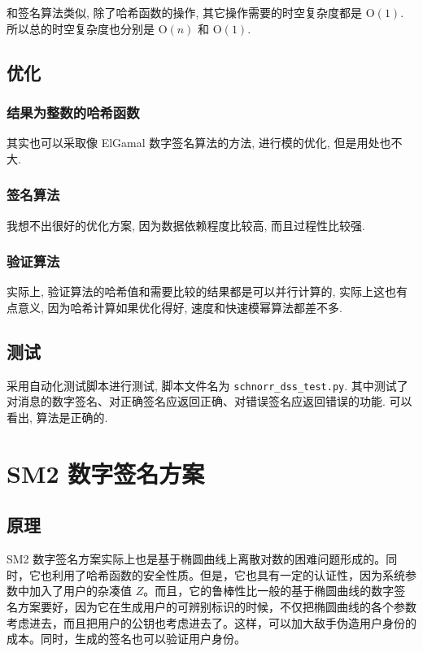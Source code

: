 \documentclass[12pt,a4paper]{article}
\begin{document}
和签名算法类似, 除了哈希函数的操作, 其它操作需要的时空复杂度都是 $ \mathrm{O}(1) $. 所以总的时空复杂度也分别是 $ \mathrm{O}(n) $ 和 $ \mathrm{O}(1) $. 

\subsection*{优化}

\subsubsection*{结果为整数的哈希函数}

其实也可以采取像 ElGamal 数字签名算法的方法, 进行模的优化, 但是用处也不大.  

\subsubsection*{签名算法}

我想不出很好的优化方案, 因为数据依赖程度比较高, 而且过程性比较强. 

\subsubsection*{验证算法}

实际上, 验证算法的哈希值和需要比较的结果都是可以并行计算的, 实际上这也有点意义, 因为哈希计算如果优化得好, 速度和快速模幂算法都差不多. 

\subsection*{测试}

采用自动化测试脚本进行测试, 脚本文件名为 \verb|schnorr_dss_test.py|. 其中测试了对消息的数字签名、对正确签名应返回正确、对错误签名应返回错误的功能. 可以看出, 算法是正确的. 

\section*{SM2 数字签名方案}

\subsection*{原理}

SM2 数字签名方案实际上也是基于椭圆曲线上离散对数的困难问题形成的。同时，它也利用了哈希函数的安全性质。但是，它也具有一定的认证性，因为系统参数中加入了用户的杂凑值 $ Z $。而且，它的鲁棒性比一般的基于椭圆曲线的数字签名方案要好，因为它在生成用户的可辨别标识的时候，不仅把椭圆曲线的各个参数考虑进去，而且把用户的公钥也考虑进去了。这样，可以加大敌手伪造用户身份的成本。同时，生成的签名也可以验证用户身份。
\end{document}
